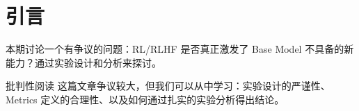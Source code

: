 \section{引言}
本期讨论一个有争议的问题：RL/RLHF 是否真正激发了 Base Model 不具备的新能力？通过实验设计和分析来探讨。

\begin{knowledgebox}{批判性阅读}
这篇文章争议较大，但我们可以从中学习：实验设计的严谨性、Metrics 定义的合理性、以及如何通过扎实的实验分析得出结论。
\end{knowledgebox}

